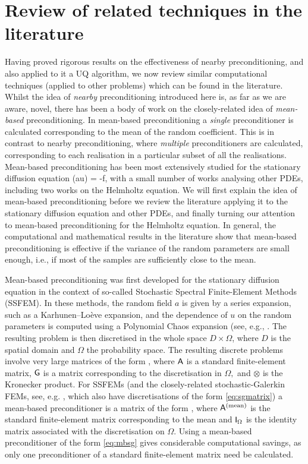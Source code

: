 \section{Review of related techniques in the literature}\label{sec:nbpclitreview}
   
Having proved rigorous results on the effectiveness of nearby preconditioning, and also applied to it a UQ algorithm, we now review similar computational techniques (applied to other problems) which can be found in the literature. Whilst the idea of \emph{nearby} preconditioning introduced here is, as far as we are aware, novel, there has been a body of work on the closely-related idea of \emph{mean-based} preconditioning. In mean-based preconditioning a \emph{single} preconditioner is calculated corresponding to the mean of the random coefficient. This is in contrast to nearby preconditioning, where \emph{multiple} preconditioners are calculated, corresponding to each realisation in a particular subset of all the realisations. Mean-based preconditioning has been most extensively studied for the stationary diffusion equation
    \beqs
\grad \cdot \mleft(a\grad u\mright)  = -f,
\eeqs
with a small number of works analysing other PDEs, including two works on the Helmholtz equation. We will first explain the idea of mean-based preconditioning before we review the literature applying it to the stationary diffusion equation and other PDEs, and finally turning our attention to mean-based preconditioning for the Helmholtz equation. In general, the computational and mathematical results in the literature show that mean-based preconditioning  is effective if the variance of the random parameters are small enough, i.e.,  if most of the samples are sufficiently close to the mean.

Mean-based preconditioning was first developed for the stationary diffusion equation in the context of so-called Stochastic Spectral Finite-Element Methods (SSFEM). In these methods, the random field $a$ is given by a series expansion, such as a Karhunen--Lo\`eve expansion, and the dependence of $u$ on the random parameters is computed using a Polynomial Chaos expansion (see, e.g., \cite{GhSp:12}. The resulting problem is then discretised in the whole space $D \times \Omega$, where $D$ is the spatial domain and $\Omega$ the probability space. The resulting discrete problems involve very large matrices of the form
\beq\label{eq:sgmatrix}
\Amat \otimes \Gmat,
\eeq
where $\mathsf{A}$ is a standard finite-element matrix, $\mathsf{G}$ is a matrix corresponding to the discretisation in $\Omega,$ and $\otimes$ is the Kronecker product. For SSFEMs (and the closely-related stochastic-Galerkin FEMs, see, e.g. \cite{BaTeZo:04}, which also have discretisations of the form \cref{eq:sgmatrix}) a mean-based preconditioner is a matrix of the form
\beq\label{eq:mbsg}
\Amatmean \otimes \ImatOmega,
\eeq
where $\mathsf{A}^{(\mathrm{mean})}$ is the standard finite-element matrix corresponding to the mean and $\mathsf{I}_{\Omega}$ is the identity matrix associated with the discretisation on $\Omega.$ Using a mean-based preconditioner of the form \cref{eq:mbsg} gives considerable computational savings, as only one preconditioner of a standard finite-element matrix need be calculated.

